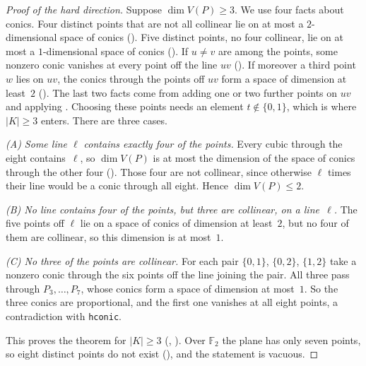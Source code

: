 \documentclass[11pt]{article}
\theoremstyle{definition}
\theoremstyle{remark}
\newcommand{\lean}[1]{\texttt{#1}}
\newcommand{\F}{\mathbb{F}}
\begin{document}
\begin{proof}[Proof of the hard direction]
Suppose $\dim V(P)\ge 3$. We use four facts about conics. Four distinct points that are not all
collinear lie on at most a $2$-dimensional space of conics (). Five
distinct points, no four collinear, lie on at most a $1$-dimensional space of conics
(). If $u\ne v$ are among the points, some nonzero conic vanishes at every
point off the line $uv$ (). If moreover a third point $w$ lies on
$uv$, the conics through the points off $uv$ form a space of dimension at least~$2$
(). The last two facts come from adding one or two further points on
$uv$ and applying . Choosing these points needs an element $t\notin\{0,1\}$,
which is where $|K|\ge3$ enters. There are three cases.

\emph{(A) Some line $\ell$ contains exactly four of the points.} Every cubic through the eight
contains~$\ell$, so $\dim V(P)$ is at most the dimension of the space of conics through the other
four (). Those four are not collinear, since otherwise $\ell$ times their line
would be a conic through all eight. Hence $\dim V(P)\le 2$.

\emph{(B) No line contains four of the points, but three are collinear, on a line~$\ell$.} The
five points off $\ell$ lie on a space of conics of dimension at least~$2$, but no four of them
are collinear, so this dimension is at most~$1$.

\emph{(C) No three of the points are collinear.} For each pair $\{0,1\}$, $\{0,2\}$, $\{1,2\}$
take a nonzero conic through the six points off the line joining the pair. All three pass through
$P_3,\dots,P_7$, whose conics form a space of dimension at most~$1$. So the three conics are
proportional, and the first one vanishes at all eight points, a contradiction with \lean{hconic}.

This proves the theorem for $|K|\ge3$ (,
). Over $\F_2$ the plane has only seven points, so eight
distinct points do not exist (), and the statement is
vacuous.
\end{proof}
\end{document}
